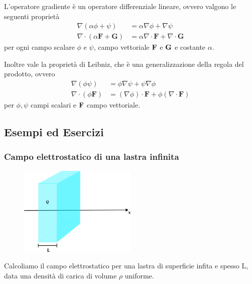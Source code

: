 L'operatore gradiente \`e un operatore differenziale lineare, ovvero valgono le seguenti propriet\`a 
\begin{equation}
\begin{aligned}
\nabla(\alpha \phi+\psi) & =\alpha \nabla \phi+\nabla \psi \\
\nabla \cdot(\alpha \mathbf{F}+\mathbf{G}) & =\alpha \nabla \cdot \mathbf{F}+\nabla \cdot \mathbf{G}
\end{aligned}
\end{equation}
per ogni campo scalare $\phi$ e $\psi$, campo vettoriale $\bold{F}$ e $\bold{G}$ e costante $\alpha$.

Inoltre vale la propriet\`a di Leibniz, che \`e una generalizzazione della regola del prodotto, ovvero
\begin{equation}
\begin{aligned}
\nabla(\phi \psi) & =\phi \nabla \psi+\psi \nabla \phi \\
\nabla \cdot(\phi \mathbf{F}) & =(\nabla \phi) \cdot \mathbf{F}+\phi(\nabla \cdot \mathbf{F})
\end{aligned}
\end{equation} 
per $\phi,\psi$ campi scalari e $\bold{F}$ campo vettoriale.

\subsection{Esempi ed Esercizi}

\subsubsection{Campo elettrostatico di una lastra infinita}

\begin{figure}
  \centering
  \includegraphics[width=0.5\textwidth]{images/lastra}
\end{figure}

Calcoliamo il campo elettrostatico per una lastra di superficie infita e spesso L, data una densit\`a di carica di volume $\rho$ uniforme. 
\\

